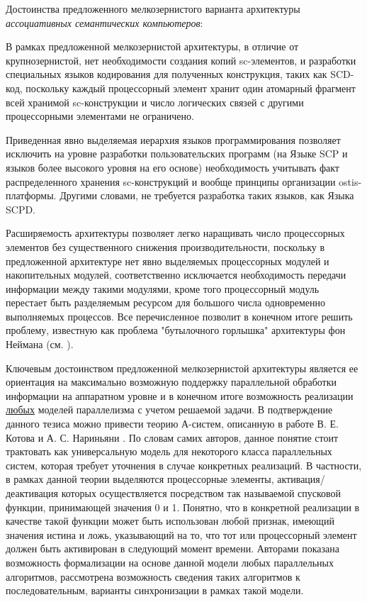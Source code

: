 Достоинства предложенного мелкозернистого варианта архитектуры \textit{ассоциативных семантических компьютеров}:
\begin{textitemize}
	\item В рамках предложенной мелкозернистой архитектуры, в отличие от крупнозернистой, нет необходимости создания копий sc-элементов, и разработки специальных языков кодирования для полученных конструкция, таких как SCD-код, поскольку каждый процессорный элемент хранит один атомарный фрагмент всей хранимой sc-конструкции и число логических связей с другими процессорными элементами не ограничено.
	\item Приведенная явно выделяемая иерархия языков программирования позволяет исключить на уровне разработки пользовательских программ (на Языке SCP и языков более высокого уровня на его основе) необходимость учитывать факт распределенного хранения sc-конструкций и вообще принципы организации ostis-платформы. Другими словами, не требуется разработка таких языков, как Языка SCPD.
	\item Расширяемость архитектуры позволяет легко наращивать число процессорных элементов без существенного снижения производительности, поскольку в предложенной архитектуре нет явно выделяемых процессорных модулей и накопительных модулей, соответственно исключается необходимость передачи информации между такими модулями, кроме того процессорный модуль перестает быть разделяемым ресурсом для большого числа одновременно выполняемых процессов. Все перечисленное позволит в конечном итоге решить проблему, известную как проблема "бутылочного горлышка"{} архитектуры фон Неймана (см. ).
	\item Ключевым достоинством предложенной мелкозернистой архитектуры является ее ориентация на максимально возможную поддержку параллельной обработки информации на аппаратном уровне и в конечном итоге возможность реализации \underline{любых} моделей параллелизма с учетом решаемой задачи. В подтверждение данного тезиса можно привести теорию А-систем, описанную в работе В. Е. Котова и А. С. Нариньяни . По словам самих авторов, данное понятие стоит трактовать как универсальную модель для некоторого класса параллельных систем, которая требует уточнения в случае конкретных реализаций. В частности, в рамках данной теории выделяются процессорные элементы, активация/деактивация которых осуществляется посредством так называемой спусковой функции, принимающей значения 0 и 1. Понятно, что в конкретной реализации в качестве такой функции может быть использован любой признак, имеющий значения истина и ложь, указывающий на то, что тот или процессорный элемент должен быть активирован в следующий момент времени. Авторами показана возможность формализации на основе данной модели любых параллельных алгоритмов, рассмотрена возможность сведения таких алгоритмов к последовательным, варианты синхронизации в рамках такой модели. 
	

\end{textitemize}
